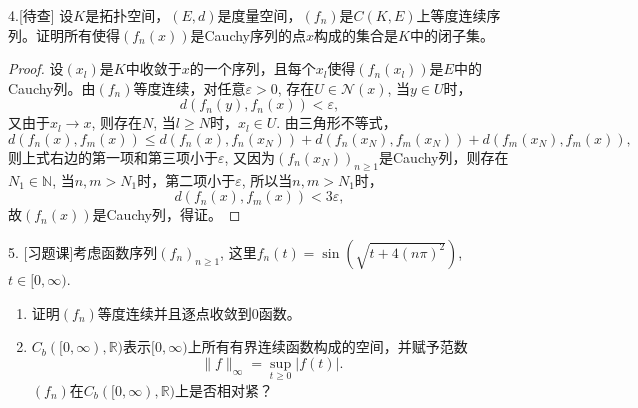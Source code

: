 \documentclass[a4paper,8pt]{ctexart}\textwidth 140mm \textheight 216mm
\newcommand{\e}{\varepsilon}
\newcommand{\8}{\infty}
\begin{document}
4.[待查] 设$K$是拓扑空间，$(E,d)$是度量空间，$(f_n)$是$C(K,E)$上等度连续序列。证明所有使得$(f_n(x))$是Cauchy序列的点$x$构成的集合是$K$中的闭子集。
\begin{proof}
	设$(x_l)$是$K$中收敛于$x$的一个序列，且每个$x_l$使得$(f_n(x_l))$是$E$中的Cauchy列。由$(f_n)$等度连续，对任意$\e>0$, 存在$U\in\mathcal{N}(x)$, 当$y\in U$时，
	$$d(f_n(y),f_n(x))<\e,$$
	又由于$x_l\to x$, 则存在$N$, 当$l\geq N$时，$x_l\in U$. 由三角形不等式，
	\[d(f_n(x),f_m(x))\leq d(f_n(x),f_n(x_N))+d(f_n(x_N),f_m(x_N))+d(f_m(x_N),f_m(x)),\]
	则上式右边的第一项和第三项小于$\e$, 又因为$(f_n(x_N))_{n\geq 1}$是Cauchy列，则存在$N_1\in\mathbb{N}$, 当$n,m>N_1$时，第二项小于$\e$, 所以当$n,m>N_1$时，
	$$d(f_n(x),f_m(x))<3\e,$$
	故$(f_n(x))$是Cauchy列，得证。
\end{proof}

5. [习题课]考虑函数序列$(f_n)_{n\geq 1}$, 这里$f_n(t)=\sin(\sqrt{t+4(n\pi)^2})$, $t\in[0,\infty)$.
\begin{enumerate}
	\item[(a)] 证明$(f_n)$等度连续并且逐点收敛到0函数。
	\item[(b)] $C_b([0,\infty),\mathbb{R})$表示$[0,\infty)$上所有有界连续函数构成的空间，并赋予范数
	$$\|f\|_\infty=\sup_{t\geq 0}|f(t)|.$$
	$(f_n)$在$C_b([0,\infty),\mathbb{R})$上是否相对紧？
\end{enumerate}
\end{document}
